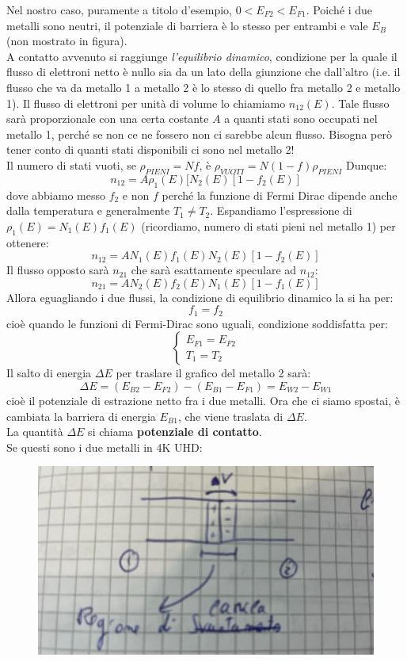 \documentclass{book}
\begin{document}
        Nel nostro caso, puramente a titolo d'esempio, $0<E_{F2} <E_{F1}$. Poiché i due metalli sono neutri, il potenziale di barriera è lo stesso per entrambi e vale $E_{B}$ (non mostrato in figura).\\
        A contatto avvenuto si raggiunge \textit{l'equilibrio dinamico}, condizione per la quale il flusso di elettroni netto è nullo sia da un lato della giunzione che dall'altro (i.e. il flusso che va da metallo 1 a metallo 2 è lo stesso di quello fra metallo 2 e metallo 1).
        Il flusso di elettroni per unità di volume lo chiamiamo $n_{12}(E)$.
        Tale flusso sarà proporzionale con una certa costante $A$ a quanti stati sono occupati nel metallo 1, perché se non ce ne fossero non ci sarebbe alcun flusso. Bisogna però tener conto di quanti stati disponibili ci sono nel metallo 2!\\
        Il numero di stati vuoti, se $\rho_{PIENI} = Nf$, è $\rho_{VUOTI} = N(1-f)\rho_{PIENI}$
        Dunque:
        $$n_{12} = A \rho_{1}(E)[N_{2}(E)[1-f_{2}(E)]$$
        dove abbiamo messo $f_{2}$ e non $f$ perché la funzione di Fermi Dirac dipende anche dalla temperatura e generalmente $T_{1} \neq T_{2}$.
        Espandiamo l'espressione di $\rho_{1}(E) =N_{1}(E)f_{1}(E)$ (ricordiamo, numero di stati pieni nel metallo 1) per ottenere:
        $$n_{12} = AN_{1}(E)f_{1}(E)N_{2}(E)[1-f_{2}(E)]$$
        Il flusso opposto sarà $n_{21}$ che sarà esattamente speculare ad $n_{12}$:
        $$n_{21} = AN_{2}(E)f_{2}(E)N_{1}(E)[1-f_{1}(E)]$$
        Allora eguagliando i due flussi, la condizione di equilibrio dinamico la si ha per:
        $$f_{1} = f_{2}$$
        cioè quando le funzioni di Fermi-Dirac sono uguali, condizione soddisfatta per:
        $$\begin{cases}
            E_{F1} = E_{F2} \\
            T_{1} = T_{2}
        \end{cases}$$
        Il salto di energia $\Delta E$ per traslare il grafico del metallo 2 sarà:
        $$\Delta E = (E_{B2} - E_{F2})-(E_{B1} - E_{F1}) = E_{W2} - E_{W1}$$
        cioè il potenziale di estrazione netto fra i due metalli. Ora che ci siamo spostai, è cambiata la barriera di energia $E_{B1}$, che viene traslata di $\Delta E$.\\
        La quantità $\Delta E$ si chiama \textbf{potenziale di contatto}.\\
        \newpage
        Se questi sono i due metalli in 4K UHD:
        \begin{figure}[h!]
            \centering
            \includegraphics[width=0.75\linewidth]{img/metal1.png}
        \end{figure}
\end{document}

